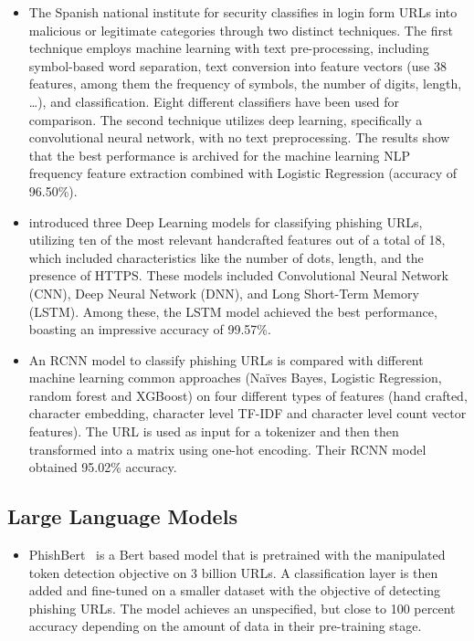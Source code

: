 \documentclass{article}
\begin{document}
    \begin{itemize}
        \item  The Spanish national institute for security classifies in\cite{PhishingLoginURLDetection} login form URLs into malicious or legitimate categories through two distinct techniques.
        The first technique employs machine learning with text pre-processing, including symbol-based word separation, text conversion into feature vectors (use 38 features, among them the frequency of symbols, the number of digits, length, \ldots), and classification.
        Eight different classifiers have been used for comparison.
        The second technique utilizes deep learning, specifically a convolutional neural network, with no text preprocessing.
        The results show that the best performance is archived for the machine learning NLP frequency feature extraction combined with Logistic Regression (accuracy of 96.50\%).


        \item \cite{EfficientDeepLearningPhishingDetection} introduced three Deep Learning models for classifying phishing URLs, utilizing ten of the most relevant handcrafted features out of a total of 18, which included characteristics like the number of dots, length, and the presence of HTTPS. These models included Convolutional Neural Network (CNN), Deep Neural Network (DNN), and Long Short-Term Memory (LSTM). Among these, the LSTM model achieved the best performance, boasting an impressive accuracy of 99.57\%.

        \item An RCNN model to classify phishing URLs is compared with different machine learning common approaches (Naïves Bayes, Logistic Regression, random forest and XGBoost) on four different types of features (hand crafted, character embedding, character level TF-IDF and character level count vector features)\cite{CharacterLevelCNN}.
        The URL is used as input for a tokenizer and then then transformed into a matrix using one-hot encoding.
        Their RCNN model obtained 95.02\% accuracy.

    \end{itemize}

    \subsection{Large Language Models}\label{subsec:large-language-models}

    \begin{itemize}
        \item PhishBert~\cite{PhishBert} is a Bert based model that is pretrained with the manipulated token detection objective on 3 billion URLs. A classification layer is then added and fine-tuned on a smaller dataset with the objective of detecting phishing URLs. The model achieves an unspecified, but close to 100 percent accuracy depending on the amount of data in their pre-training stage.
    \end{itemize}
\end{document}

